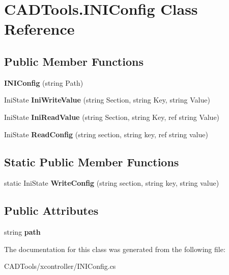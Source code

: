 \hypertarget{class_c_a_d_tools_1_1_i_n_i_config}{}\section{C\+A\+D\+Tools.\+I\+N\+I\+Config Class Reference}
\label{class_c_a_d_tools_1_1_i_n_i_config}
\subsection*{Public Member Functions}
\begin{DoxyCompactItemize}
\item 
\mbox{\label{class_c_a_d_tools_1_1_i_n_i_config_ac507fbf34761f4a1d13f1d5c05709583}} 
{\bfseries I\+N\+I\+Config} (string Path)
\item 
\mbox{\label{class_c_a_d_tools_1_1_i_n_i_config_a95a910d6bf2d054a9c01fb3138b36c59}} 
Ini\+State {\bfseries Ini\+Write\+Value} (string Section, string Key, string Value)
\item 
\mbox{\label{class_c_a_d_tools_1_1_i_n_i_config_a60b530497f4cd26d5e752e641c6d1a32}} 
Ini\+State {\bfseries Ini\+Read\+Value} (string Section, string Key, ref string Value)
\item 
\mbox{\label{class_c_a_d_tools_1_1_i_n_i_config_a507a084753dcffe7a0f06cf330ae0ac0}} 
Ini\+State {\bfseries Read\+Config} (string section, string key, ref string value)
\end{DoxyCompactItemize}
\subsection*{Static Public Member Functions}
\begin{DoxyCompactItemize}
\item 
\mbox{\label{class_c_a_d_tools_1_1_i_n_i_config_a474cb359ae0806a3ff7916849d003ee0}} 
static Ini\+State {\bfseries Write\+Config} (string section, string key, string value)
\end{DoxyCompactItemize}
\subsection*{Public Attributes}
\begin{DoxyCompactItemize}
\item 
\mbox{\label{class_c_a_d_tools_1_1_i_n_i_config_a4956f766ebe1714fac8a18081f524324}} 
string {\bfseries path}
\end{DoxyCompactItemize}


The documentation for this class was generated from the following file\+:\begin{DoxyCompactItemize}
\item 
C\+A\+D\+Tools/xcontroller/I\+N\+I\+Config.\+cs\end{DoxyCompactItemize}
